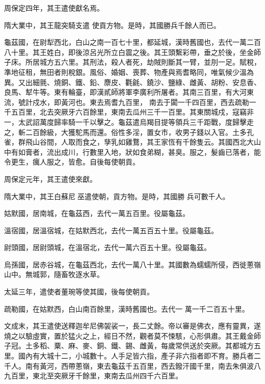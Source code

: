 \begin{pinyinscope}
 周保定四年，其王遣使獻名焉。



 隋大業中，其王龍突騎支遣
 使貢方物。是時，其國勝兵千餘人而已。



 龜茲國，在尉犁西北，白山之南一百七十里，都延城，漢時舊國也，去代一萬二百八十里。其王姓白，即後涼呂光所立白震之後。其王頭繫彩帶，垂之於後，坐金師子床。所居城方五六里。其刑法，殺人者死，劫賊則斷其一臂，並刖一足。賦稅，準地征租，無田者則稅銀。風俗、婚姻、喪葬、物產與焉耆略同，唯氣候少溫為異。又出細氈、燒銅、鐵、鉛、麖皮、氍毹、鐃沙、鹽綠、雌黃、胡粉、安息香、良馬、犎牛等。東有輪臺，即漢貳師將軍李廣利所屠者。其南三百里，有大河東流，號計戍水，即黃河也。東去焉耆九百里，
 南去于闐一千四百里，西去疏勒一千五百里，北去突厥牙六百餘里，東南去瓜州三千一百里。其東關城戍，寇竊非一，太武詔萬度歸率騎一千以擊之。龜茲遣烏羯目提等領兵三千距戰，度歸擊走之，斬二百餘級，大獲駝馬而還。俗性多淫，置女市，收男子錢以入官。土多孔雀，群飛山谷間，人取而食之，孳乳如雞鶩，其王家恆有千餘隻云。其國西北大山中有如膏者，流出成川，行數里入地，狀如食弟糊，甚臭。服之，髮齒已落者，能令更生，癘人服之，皆愈。自後每使朝貢。



 周保定元年，其王遣使來獻。



 隋大業中，其王白蘇尼巫遣使朝，貢方物。是時，其國勝
 兵可數千人。



 姑默國，居南城，在龜茲西，去代一萬五百里。役屬龜茲。



 溫宿國，居溫宿城，在姑默西北，去代一萬五百五十里。役屬龜茲。



 尉頭國，居尉頭城，在溫宿北，去代一萬六百五十里。役屬龜茲。



 烏孫國，居赤谷城，在龜茲西北，去代一萬八十里。其國數為蠕蠕所侵，西徙蔥嶺山中。無城郭，隨畜牧逐水草。



 太延三年，遣使者董琬等使其國，後每使朝貢。



 疏勒國，在姑默西，白山南百餘里，漢時舊國也。去代一
 萬一千二百五十里。



 文成末，其王遣使送釋迦牟尼佛袈裟一，長二丈餘。帝以審是佛衣，應有靈異，遂燒之以驗虛實，置於猛火之上，經日不然，觀者莫不悚駭，心形俱肅。其王戴金師子冠。土多稻、粟、麻、麥、銅、鐵、錫、雌黃，每歲常供送於突厥。其都城方五里。國內有大城十二，小城數十。人手足皆六指，產子非六指者即不育。勝兵者二千人。南有黃河，西帶蔥嶺，東去龜茲千五百里，西去鏺汗國千里，南去朱俱波八九百里，東北至突厥牙千餘里，東南去瓜州四千六百里。




\end{pinyinscope}

